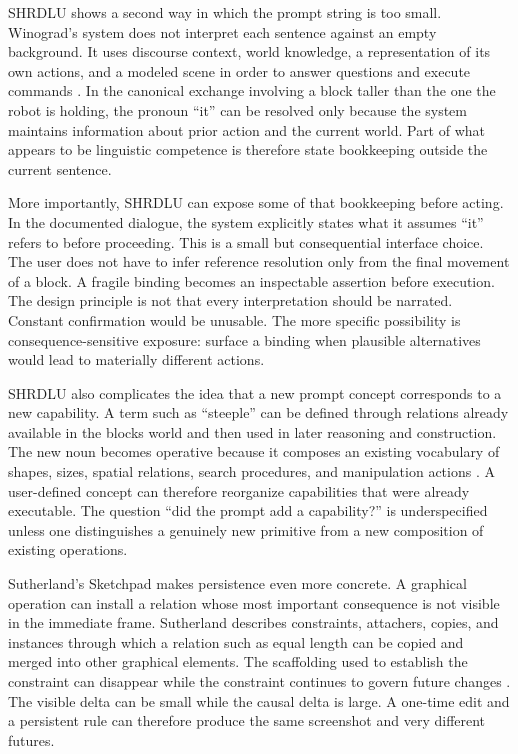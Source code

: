 \documentclass[11pt]{article}
\begin{document}
SHRDLU shows a second way in which the prompt string is too small. Winograd's system does not interpret each sentence against an empty background. It uses discourse context, world knowledge, a representation of its own actions, and a modeled scene in order to answer questions and execute commands \citep{winograd1971procedures}. In the canonical exchange involving a block taller than the one the robot is holding, the pronoun ``it'' can be resolved only because the system maintains information about prior action and the current world. Part of what appears to be linguistic competence is therefore state bookkeeping outside the current sentence.

More importantly, SHRDLU can expose some of that bookkeeping before acting. In the documented dialogue, the system explicitly states what it assumes ``it'' refers to before proceeding. This is a small but consequential interface choice. The user does not have to infer reference resolution only from the final movement of a block. A fragile binding becomes an inspectable assertion before execution. The design principle is not that every interpretation should be narrated. Constant confirmation would be unusable. The more specific possibility is consequence-sensitive exposure: surface a binding when plausible alternatives would lead to materially different actions.

SHRDLU also complicates the idea that a new prompt concept corresponds to a new capability. A term such as ``steeple'' can be defined through relations already available in the blocks world and then used in later reasoning and construction. The new noun becomes operative because it composes an existing vocabulary of shapes, sizes, spatial relations, search procedures, and manipulation actions \citep{winograd1971procedures}. A user-defined concept can therefore reorganize capabilities that were already executable. The question ``did the prompt add a capability?'' is underspecified unless one distinguishes a genuinely new primitive from a new composition of existing operations.

Sutherland's Sketchpad makes persistence even more concrete. A graphical operation can install a relation whose most important consequence is not visible in the immediate frame. Sutherland describes constraints, attachers, copies, and instances through which a relation such as equal length can be copied and merged into other graphical elements. The scaffolding used to establish the constraint can disappear while the constraint continues to govern future changes \citep{sutherland1963sketchpad}. The visible delta can be small while the causal delta is large. A one-time edit and a persistent rule can therefore produce the same screenshot and very different futures.
\end{document}
